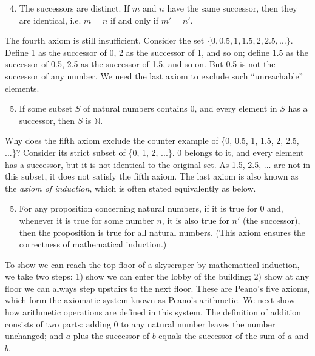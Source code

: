\documentclass[b5paper]{article}
\begin{document}
\begin{enumerate}[{Axiom} (1)]
  \setcounter{enumi}{3}
  \item The successors are distinct. If $m$ and $n$ have the same successor, then they are identical, i.e. $m = n$ if and only if $m' = n'$.
\end{enumerate}

The fourth axiom is still insufficient. Consider the set $\{0, 0.5, 1, 1.5, 2, 2.5, \ldots\}$. Define 1 as the successor of 0, 2 as the successor of 1, and so on; define 1.5 as the successor of 0.5, 2.5 as the successor of 1.5, and so on. But 0.5 is not the successor of any number. We need the last axiom to exclude such \enquote{unreachable} elements.

\begin{enumerate}[{Axiom} (1)]
  \setcounter{enumi}{4}
  \item If some subset $S$ of natural numbers contains 0, and every element in $S$ has a successor, then $S$ is $\mathbb{N}$.
\end{enumerate}

 
Why does the fifth axiom exclude the counter example of \{0, 0.5, 1, 1.5, 2, 2.5, ...\}? Consider its strict subset of \{0, 1, 2, ...\}. 0 belongs to it, and every element has a successor, but it is not identical to the original set. As 1.5, 2.5, ... are not in this subset, it does not satisfy the fifth axiom. The last axiom is also known as the {\em axiom of induction}, which is often stated equivalently as below.

\begin{enumerate}[{Axiom} 1)]
  \setcounter{enumi}{4}
  \item For any proposition concerning natural numbers, if it is true for 0 and, whenever it is true for some number $n$, it is also true for $n'$ (the successor), then the proposition is true for all natural numbers. (This axiom ensures the correctness of mathematical induction.)
\end{enumerate}

To show we can reach the top floor of a skyscraper by mathematical induction, we take two steps: 1) show we can enter the lobby of the building; 2) show at any floor we can always step upstairs to the next floor. These are Peano's five axioms, which form the axiomatic system known as Peano's arithmetic. We next show how arithmetic operations are defined in this system. The definition of addition consists of two parts: adding 0 to any natural number leaves the number unchanged; and $a$ plus the successor of $b$ equals the successor of the sum of $a$ and $b$. 
\end{document}
